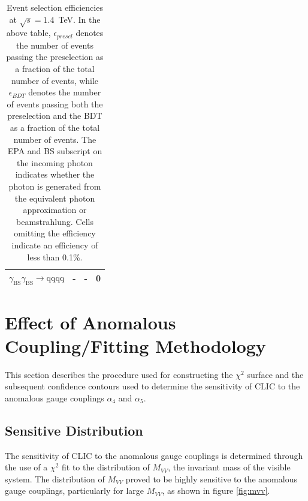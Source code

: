 \begin{table}[h!]
\begin{tabular}{ l r r r }
$\gamma_{\text{BS}}\gamma_{\text{BS}} \rightarrow \text{qqqq}$ & - & - & 0 \\
\hline
\end{tabular}
\caption[Event selection efficiencies at $\sqrt{s}=1.4$~TeV.  In the above table, $\epsilon_{presel}$ denotes the number of events passing the preselection as a fraction of the total number of events, while $\epsilon_{BDT}$ denotes the number of events passing both the preselection and the BDT as a fraction of the total number of events.  The EPA and BS subscript on the incoming photon indicates whether the photon is generated from the equivalent photon approximation or beamstrahlung.  Cells omitting the efficiency indicate an efficiency of less than 0.1\%.]{Event selection efficiencies at $\sqrt{s}=1.4$~TeV.  In the above table, $\epsilon_{presel}$ denotes the number of events passing the preselection as a fraction of the total number of events, while $\epsilon_{BDT}$ denotes the number of events passing both the preselection and the BDT as a fraction of the total number of events.  The EPA and BS subscript on the incoming photon indicates whether the photon is generated from the equivalent photon approximation or beamstrahlung.  Cells omitting the efficiency indicate an efficiency of less than 0.1\%.}
\label{table:selectionsummary1400GeV}
\end{table}


\section{Effect of Anomalous Coupling/Fitting Methodology}
\label{sec:fitting}
This section describes the procedure used for constructing the $\chi^{2}$ surface and the subsequent confidence contours used to determine the sensitivity of CLIC to the anomalous gauge couplings $\alpha_{4}$ and $\alpha_{5}$.


\subsection{Sensitive Distribution}
The sensitivity of CLIC to the anomalous gauge couplings is determined through the use of a $\chi^{2}$ fit to the distribution of $M_{VV}$, the invariant mass of the visible system.  The distribution of $M_{VV}$ proved to be highly sensitive to the anomalous gauge couplings, particularly for large $M_{VV}$, as shown in figure \ref{fig:mvv}.

